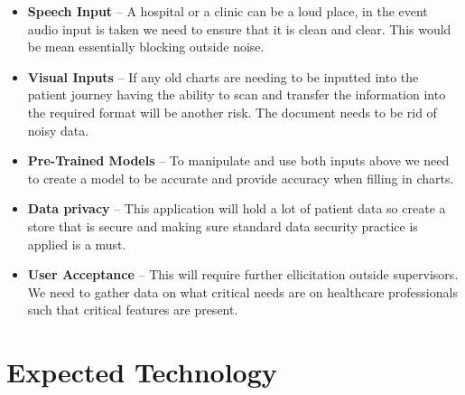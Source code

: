 \documentclass{article}
\begin{document}
\begin{itemize}
  \item \textbf{Speech Input} -- A hospital or a clinic can be a loud place, in the event audio input is taken we need to ensure that it is clean and clear. This would be mean essentially blocking outside noise. 
  \item \textbf{Visual Inputs} -- If any old charts are needing to be inputted into the patient journey having the ability to scan and transfer the information into the required format will be another risk. The document needs to be rid of noisy data.
  \item \textbf{Pre-Trained Models} -- To manipulate and use both inputs above we need to create a model to be accurate and provide accuracy when filling in charts. 
  \item \textbf{Data privacy} -- This application will hold a lot of patient data so create a store that is secure and making sure standard data security practice is applied is a must.
  \item \textbf{User Acceptance} -- This will require further ellicitation outside supervisors. We need to gather data on what critical needs are on healthcare professionals such that critical features are present. 
\end{itemize}

\section{Expected Technology}


\end{document}
